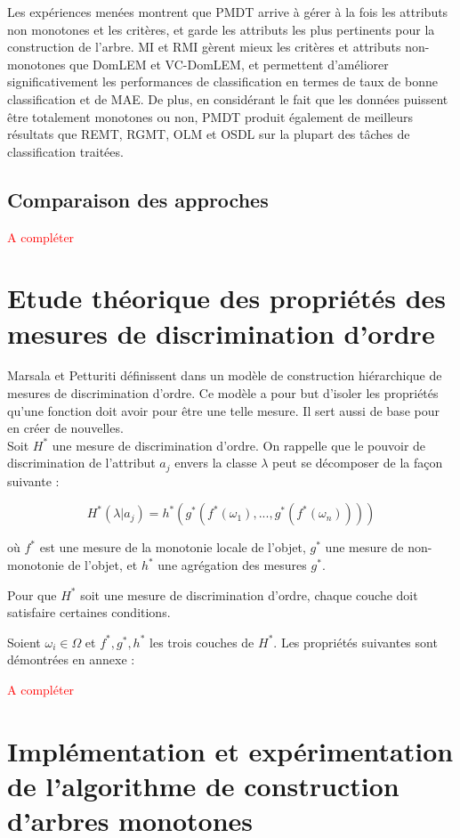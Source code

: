 \documentclass[a4paper]{article}
\begin{document}
Les expériences menées montrent que PMDT arrive à gérer à la fois les attributs
non monotones et les critères, et garde les attributs les plus pertinents pour
la construction de l'arbre. MI et RMI gèrent mieux les critères et attributs
non-monotones que DomLEM et VC-DomLEM, et permettent d'améliorer
significativement les performances de classification en termes de taux de bonne
classification et de MAE. De plus, en considérant le fait que les données
puissent être totalement monotones ou non, PMDT produit également de meilleurs
résultats que REMT, RGMT, OLM et OSDL sur la plupart des tâches de
classification traitées.

\subsection{Comparaison des approches}

\textcolor{red}{A compléter} %


\section{Etude théorique des propriétés des mesures de discrimination d'ordre}
Marsala et Petturiti définissent dans \cite{marsala-rank} un modèle de
construction hiérarchique de mesures de discrimination d'ordre. Ce modèle a pour
but d'isoler les propriétés qu'une fonction doit avoir pour être une telle
mesure. Il sert aussi de base pour en créer de nouvelles. \\

Soit $H^*$ une mesure de discrimination d'ordre. On rappelle que le pouvoir de
discrimination de l'attribut $a_j$ envers la classe $\lambda$ peut se décomposer
de la façon suivante :

$$ H^*(\lambda|a_j) = h^*(g^*(f^*(\omega_1),...,g^*(f^*(\omega_n))))$$

où $f^*$ est une mesure de la monotonie locale de l'objet, $g^*$ une mesure
de non-monotonie de l'objet, et $h^*$ une agrégation des mesures $g^*$.

Pour que $H^*$ soit une mesure de discrimination d'ordre, chaque couche doit
satisfaire certaines conditions.

Soient $\omega_i \in \Omega$ et $f^*, g^*, h^*$ les trois couches de $H^*$. Les propriétés suivantes sont
démontrées en annexe :


\textcolor{red}{A compléter} %

\section{Implémentation et expérimentation de l'algorithme de construction
d'arbres monotones} 
\end{document}
